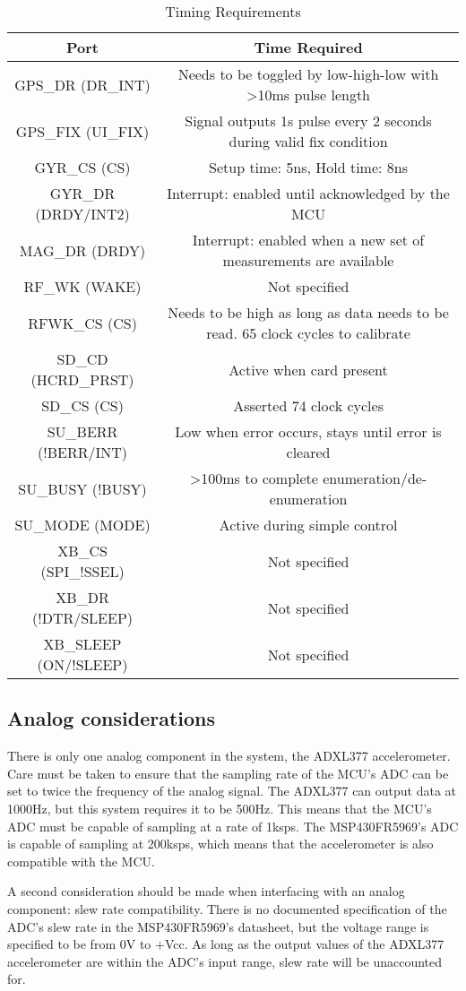 \begin{table}[H]
  \centering
  \caption{Timing Requirements}
    \begin{tabular}{|c|c|}
    \hline
    Port  & Time Required \\
    \hline \hline
    GPS\_DR (DR\_INT) & Needs to be toggled by low-high-low with >10ms pulse length \\ \hline
    GPS\_FIX (UI\_FIX) & Signal outputs 1s pulse every 2 seconds during valid fix condition \\ \hline
    GYR\_CS (CS) & Setup time: 5ns, Hold time: 8ns \\ \hline
    GYR\_DR (DRDY/INT2) & Interrupt: enabled until acknowledged by the MCU \\ \hline
    MAG\_DR (DRDY) & Interrupt: enabled when a new set of measurements are available \\ \hline
    RF\_WK (WAKE) & Not specified \\ \hline
    RFWK\_CS (CS) & Needs to be high as long as data needs to be read. 65 clock cycles to calibrate \\ \hline
    SD\_CD (HCRD\_PRST) & Active when card present \\ \hline
    SD\_CS (CS) & Asserted 74 clock cycles \\ \hline
    SU\_BERR (!BERR/INT) & Low when error occurs, stays until error is cleared \\ \hline
    SU\_BUSY (!BUSY) & >100ms to complete enumeration/de-enumeration \\ \hline
    SU\_MODE (MODE) & Active during simple control \\ \hline
    XB\_CS (SPI\_!SSEL) & Not specified \\ \hline
    XB\_DR (!DTR/SLEEP) & Not specified \\ \hline
    XB\_SLEEP (ON/!SLEEP) & Not specified \\ \hline
    \end{tabular}%
  \label{tab:timeReqs}%
\end{table}%


\subsection{Analog considerations}
There is only one analog component in the system, the ADXL377 accelerometer. Care must be taken to ensure that the sampling rate of the MCU's ADC can be set to twice the frequency of the analog signal. The ADXL377 can output data at 1000Hz, but this system requires it to be 500Hz. This means that the MCU's ADC must be capable of sampling at a rate of 1ksps. The MSP430FR5969's ADC is capable of sampling at 200ksps, which means that the accelerometer is also compatible with the MCU.

A second consideration should be made when interfacing with an analog component: slew rate compatibility. There is no documented specification of the ADC's slew rate in the MSP430FR5969's datasheet, but the voltage range is specified to be from 0V to +Vcc. As long as the output values of the ADXL377 accelerometer are within the ADC's input range, slew rate will be unaccounted for.


